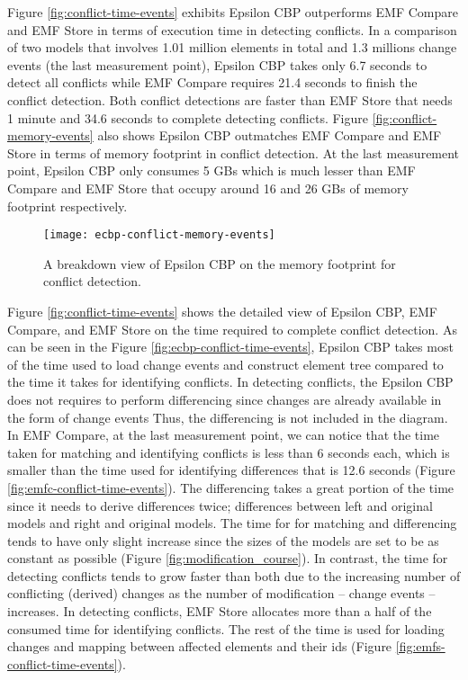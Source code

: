 Figure \ref{fig:conflict-time-events} exhibits Epsilon CBP outperforms EMF Compare and EMF Store in terms of execution time in detecting conflicts. In a comparison of two models that involves 1.01 million elements in total and 1.3 millions change events (the last measurement point), Epsilon CBP takes only 6.7 seconds to detect all conflicts while EMF Compare requires 21.4 seconds to finish the conflict detection. Both conflict detections are faster than EMF Store that needs 1 minute and 34.6 seconds to complete detecting conflicts. Figure \ref{fig:conflict-memory-events} also shows Epsilon CBP outmatches EMF Compare and EMF Store in terms of memory footprint in conflict detection. At the last measurement point, Epsilon CBP only consumes 5 GBs which is much lesser than EMF Compare and EMF Store that occupy around 16 and 26 GBs of memory footprint respectively.

\begin{wrapfigure}[11]{r}{0.5\textwidth}
  \vspace{-26pt}
  \texttt{[image: ecbp-conflict-memory-events]}
  \caption{A breakdown view of Epsilon CBP on the memory footprint for conflict detection.}
  \label{fig:ecbp-conflict-memory-events}
\end{wrapfigure}

Figure \ref{fig:conflict-time-events} shows the detailed view of Epsilon CBP, EMF Compare, and EMF Store on the time required to complete conflict detection. As can be seen in the Figure \ref{fig:ecbp-conflict-time-events}, Epsilon CBP takes most of the time used to load change events and construct element tree compared to the time it takes for identifying conflicts. In detecting conflicts, the Epsilon CBP does not requires to perform differencing since changes are already available in the form of change events Thus, the differencing is not included in the diagram. In EMF Compare, at the last measurement point, we can notice that the time taken for matching and identifying conflicts is less than 6 seconds each, which is smaller than the time used for identifying differences that is 12.6 seconds (Figure \ref{fig:emfc-conflict-time-events}). The differencing takes a great portion of the time since it needs to derive differences twice; differences between left and original models and right and original models. The time for for matching and differencing tends to have only slight increase since the sizes of the models are set to be as constant as possible (Figure \ref{fig:modification_course}). In contrast, the time for detecting conflicts tends to grow faster than both due to the increasing number of conflicting (derived) changes as the number of modification -- change events -- increases. In detecting conflicts, EMF Store allocates more than a half of the consumed time for identifying conflicts. The rest of the time is used for loading changes and mapping between affected elements and their ids (Figure \ref{fig:emfs-conflict-time-events}). 

